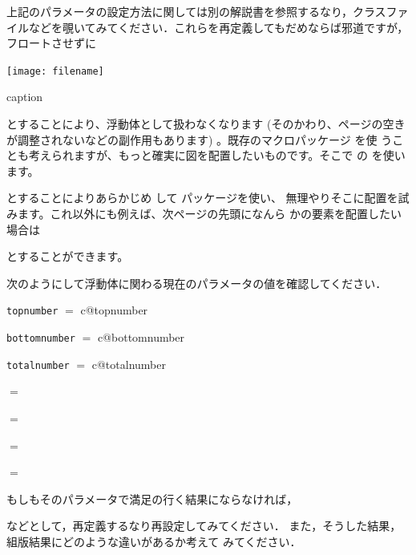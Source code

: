 上記のパラメータの設定方法に関しては別の解説書を参照するなり，クラスファ
イルなどを覗いてみてください．これらを再定義してもだめならば邪道ですが，
フロートさせずに
\begin{inputex}
\makeatletter
\newenvironment{myFigure}{%
   \begin{center}\def\@captype{figure}}{\end{center}}
\makeatother
\begin{myFigure}
   \texttt{[image: filename]}
    \caption{caption}
\end{myFigure} 
\end{inputex}

とすることにより、浮動体として扱わなくなります (そのかわり、ページの空き
が調整されないなどの副作用もあります) 。既存のマクロパッケージ  を使
うことも考えられますが、もっと確実に図を配置したいものです。そこで
の  を使います。
\begin{inputex}
\usepackage{afterpage,here}
\end{inputex}
とすることによりあらかじめ  して  パッケージを使い、
無理やりそこに配置を試みます。これ以外にも例えば、次ページの先頭になんら
かの要素を配置したい場合は
\begin{inputex}
\end{inputex}
とすることができます。%


\begin{Exe}
次のようにして浮動体に関わる現在のパラメータの値を確認してください．
\begin{inputex}
\newcommand*\checkcnt[1]{\texttt{#1} $=$ 
   \expandafter\the\csname c@#1\endcsname} 
\checkcnt{topnumber}\par
\checkcnt{bottomnumber}\par
\checkcnt{totalnumber}\par
\newcommand*\checkcmd[1]{\texttt{\string#1} $=$ #1}
\checkcmd{\topfraction}\par
\checkcmd{\bottomfraction}\par
\checkcmd{\textfraction}\par
\checkcmd{\floatpagefraction}
\end{inputex}
もしもそのパラメータで満足の行く結果にならなければ，
\begin{inputex}
\renewcommand\topfraction{0.85}
\addtocounter{topnumber}{2}
\end{inputex}
などとして，再定義するなり再設定してみてください．
また，そうした結果，組版結果にどのような違いがあるか考えて
みてください．
\end{Exe}

